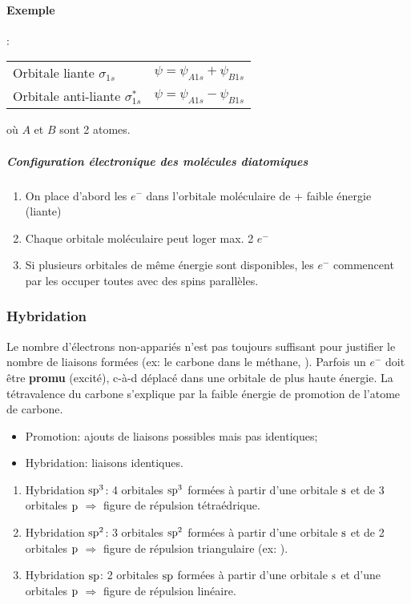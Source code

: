\paragraph{Exemple}
:
\begin{center}
  \begin{tabular}{ll}
    Orbitale liante $\sigma_{1s}$ & $\psi=\psi_{A1s}+\psi_{B1s}$\\
    Orbitale anti-liante $\sigma^{*}_{1s}$ & $\psi=\psi_{A1s}-\psi_{B1s}$
  \end{tabular}
\end{center}
où $A$ et $B$ sont 2 atomes.

\subparagraph{Configuration électronique des molécules diatomiques}
\begin{enumerate}
  \item On place d'abord les $e^-$ dans l'orbitale moléculaire de + faible énergie (liante)
  \item Chaque orbitale moléculaire peut loger max. 2 $e^-$
  \item Si plusieurs orbitales de même énergie sont disponibles,
    les $e^-$ commencent par les occuper toutes avec des spins parallèles.
\end{enumerate}

\subsubsection{Hybridation}

Le nombre d'électrons non-appariés n'est pas toujours suffisant pour justifier le nombre de liaisons formées (ex: le carbone dans le méthane,
).
Parfois un $e^-$ doit être \textbf{promu} (excité),
c-à-d déplacé dans une orbitale de plus haute énergie.
La tétravalence du carbone s'explique par la faible énergie de promotion de l'atome de carbone.
\begin{itemize}
  \item Promotion: ajouts de liaisons possibles mais pas identiques;
  \item Hybridation: liaisons identiques.
\end{itemize}
\begin{enumerate}
  \item Hybridation $\mathrm{s}\mathrm{p}^3$: 4 orbitales $\mathrm{s}\mathrm{p}^3$ formées à partir d'une orbitale $\mathrm{s}$ et de 3 orbitales $\mathrm{p}$ $\Rightarrow$ figure de répulsion tétraédrique.
  \item Hybridation $\mathrm{s}\mathrm{p}^2$: 3 orbitales $\mathrm{s}\mathrm{p}^2$ formées à partir d'une orbitale $\mathrm{s}$ et de 2 orbitales $\mathrm{p}$ $\Rightarrow$ figure de répulsion triangulaire (ex: ).
  \item Hybridation $\mathrm{s}\mathrm{p}$: 2 orbitales $\mathrm{s}\mathrm{p}$ formées à partir d'une orbitale $\mathrm{s}$ et d'une orbitales $\mathrm{p}$ $\Rightarrow$ figure de répulsion linéaire.
\end{enumerate}

